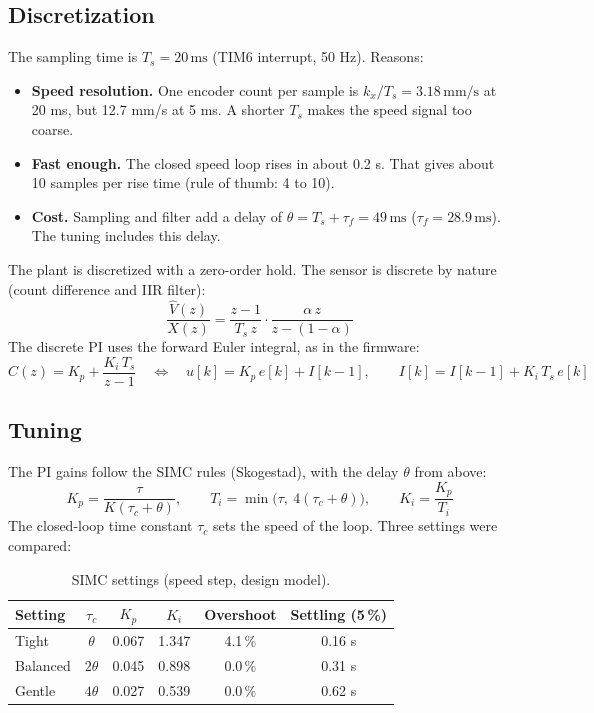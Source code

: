 \documentclass[11pt,a4paper]{article}
\begin{document}
\subsection{Discretization}
The sampling time is \(T_s = 20\,\mathrm{ms}\) (TIM6 interrupt, 50 Hz). Reasons:
\begin{itemize}
  \item \textbf{Speed resolution.} One encoder count per sample is
        \(k_x / T_s = 3.18\,\mathrm{mm/s}\) at 20 ms, but 12.7 mm/s at 5 ms.
        A shorter \(T_s\) makes the speed signal too coarse.
  \item \textbf{Fast enough.} The closed speed loop rises in about 0.2 s.
        That gives about 10 samples per rise time (rule of thumb: 4 to 10).
  \item \textbf{Cost.} Sampling and filter add a delay of
        \(\theta = T_s + \tau_f = 49\,\mathrm{ms}\) (\(\tau_f = 28.9\,\mathrm{ms}\)).
        The tuning includes this delay.
\end{itemize}
The plant is discretized with a zero-order hold.
The sensor is discrete by nature (count difference and IIR filter):
\begin{equation}
  \frac{\hat{V}(z)}{X(z)} = \frac{z - 1}{T_s\,z} \cdot \frac{\alpha\,z}{z - (1 - \alpha)}
\end{equation}
The discrete PI uses the forward Euler integral, as in the firmware:
\begin{equation}
  C(z) = K_p + \frac{K_i\,T_s}{z-1}
  \quad\Leftrightarrow\quad
  u[k] = K_p\,e[k] + I[k-1], \qquad I[k] = I[k-1] + K_i\,T_s\,e[k]
\end{equation}

\subsection{Tuning}\label{sec:tuning}
The PI gains follow the SIMC rules (Skogestad), with the delay \(\theta\) from above:
\begin{equation}
  K_p = \frac{\tau}{K(\tau_c + \theta)}, \qquad
  T_i = \min\bigl(\tau,\ 4(\tau_c + \theta)\bigr), \qquad
  K_i = \frac{K_p}{T_i}
\end{equation}
The closed-loop time constant \(\tau_c\) sets the speed of the loop.
Three settings were compared:

\begin{table}[H]
  \centering
  \caption{SIMC settings (speed step, design model).}
  \begin{tabular}{@{}lccccc@{}}
    \toprule
    \textbf{Setting} & \(\tau_c\) & \(K_p\) & \(K_i\) & \textbf{Overshoot} & \textbf{Settling (5\,\%)} \\ \midrule
    Tight    & \(\theta\)  & 0.067 & 1.347 & 4.1\,\% & 0.16 s \\
    Balanced & \(2\theta\) & 0.045 & 0.898 & 0.0\,\% & 0.31 s \\
    Gentle   & \(4\theta\) & 0.027 & 0.539 & 0.0\,\% & 0.62 s \\ \bottomrule
  \end{tabular}
\end{table}
\end{document}
